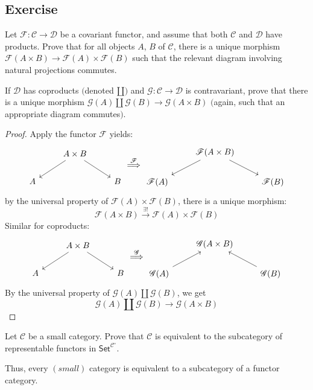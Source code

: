 \subsection{Exercise}
\begin{exercise}
Let $\mathscr{F}:\mathcal{C}\to\mathcal{D}$ be a covariant functor, and assume that both $\mathcal{C}$ and $\mathcal{D}$ have products. Prove that for all objects $A$, $B$ of $\mathcal{C}$, there is a unique morphism $\mathscr{F}(A\times B)\to\mathscr{F}(A)\times\mathscr{F}(B)$ such that the relevant diagram involving natural
projections commutes.\par
If $\mathcal{D}$ has coproducts $($denoted $\amalg$$)$ and $\mathscr{G}:\mathcal{C}\to\mathcal{D}$ is contravariant, prove that there is a unique morphism $\mathscr{G}(A)\amalg\mathscr{G}(B)\to \mathscr{G}(A\times B)$ $($again, such that an appropriate diagram commutes$)$.
\end{exercise}
\begin{proof}
Apply the functor $\mathscr{F}$ yields:
\[\begin{tikzcd}
&A\times B\ar[ld]\ar[rd]&\\
A&&B
\end{tikzcd}\stackrel{\mathscr{F}}{\Longrightarrow}\begin{tikzcd}
&\mathscr{F}(A\times B)\ar[ld]\ar[rd]&\\
\mathscr{F}(A)&&\mathscr{F}(B)
\end{tikzcd}\]
by the universal property of $\mathscr{F}(A)\times\mathscr{F}(B)$, there is a unique morphism:
\[\mathscr{F}(A\times B)\stackrel{\exists !}{\longrightarrow}\mathscr{F}(A)\times\mathscr{F}(B)\]
Similar for coproducts:
\[\begin{tikzcd}
&A\times B\ar[ld]\ar[rd]&\\
A&&B
\end{tikzcd}\stackrel{\mathscr{G}}{\Longrightarrow}\begin{tikzcd}
&\mathscr{G}(A\times B)&\\
\mathscr{G}(A)\ar[ru]&&\mathscr{G}(B)\ar[lu]
\end{tikzcd}\]
By the universal property of $\mathscr{G}(A)\amalg\mathscr{G}(B)$, we get
\[\mathscr{G}(A)\amalg\mathscr{G}(B)\to\mathscr{G}(A\times B)\]
\end{proof}
\begin{exercise}
Let $\mathcal{C}$ be a small category. Prove that $\mathcal{C}$ is equivalent to the subcategory
of representable functors in $\mathsf{Set}^{\mathcal{C}^{\circ}}$.\par
Thus, every $(small)$ category is equivalent to a subcategory of a functor category.
\end{exercise}
